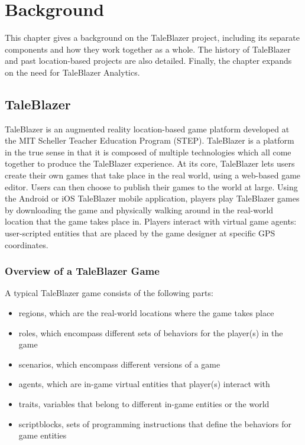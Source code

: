 \chapter{Background}

This chapter gives a background on the TaleBlazer project, including its separate components and how they work together as a whole. The history of TaleBlazer and past location-based projects are also detailed. Finally, the chapter expands on the need for TaleBlazer Analytics.

\section{TaleBlazer}

TaleBlazer is an augmented reality location-based game platform developed at the MIT Scheller Teacher Education Program (STEP). TaleBlazer is a platform in the true sense in that it is composed of multiple technologies which all come together to produce the TaleBlazer experience. At its core, TaleBlazer lets users create their own games that take place in the real world, using a web-based game editor. Users can then choose to publish their games to the world at large. Using the Android or iOS TaleBlazer mobile application, players play TaleBlazer games by downloading the game and physically walking around in the real-world location that the game takes place in. Players interact with virtual game agents: user-scripted entities that are placed by the game designer at specific GPS coordinates.

\subsection{Overview of a TaleBlazer Game}

A typical TaleBlazer game consists of the following parts: 
	\begin{itemize}
		\item regions, which are the real-world locations where the game takes place
		\item roles, which encompass different sets of behaviors for the player(s) in the game
		\item scenarios, which encompass different versions of a game
		\item agents, which are in-game virtual entities that player(s) interact with
		\item traits, variables that belong to different in-game entities or the world
		\item scriptblocks, sets of programming instructions that define the behaviors for game entities
	\end{itemize}

